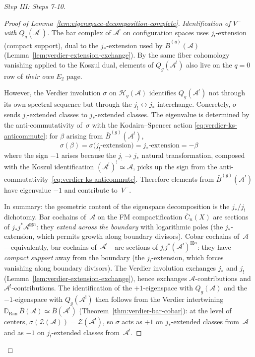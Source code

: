 \begin{proof}[Step III: Steps 7-10]
\begin{proof}[Proof of Lemma~\ref{lem:eigenspace-decomposition-complete}]
\emph{Identification of $V^-$ with $Q_g(\mathcal{A}^!)$.}
The bar complex of $\mathcal{A}^!$ on configuration spaces uses
$j_!$-extension (compact support), dual to the $j_*$-extension used
by $\bar{B}^{(g)}(\mathcal{A})$
(Lemma~\ref{lem:verdier-extension-exchange}).
By the same fiber cohomology vanishing applied to the Koszul dual,
elements of $Q_g(\mathcal{A}^!)$ also live on the $q = 0$ row of
\emph{their own} $E_2$ page.

However, the Verdier involution $\sigma$ on
$\mathcal{H}_g(\mathcal{A})$ identifies $Q_g(\mathcal{A}^!)$ not
through its own spectral sequence but through the $j_! \leftrightarrow j_*$
interchange.  Concretely, $\sigma$ sends
$j_!$-extended classes to $j_*$-extended classes.
The eigenvalue is determined by the anti-commutativity
of~$\sigma$ with the Kodaira--Spencer action
\eqref{eq:verdier-ks-anticommute}: for $\beta$ arising from
$\bar{B}^{(g)}(\mathcal{A}^!)$,
\[
\sigma(\beta)
= \sigma\bigl(\text{$j_!$-extension}\bigr)
= \text{$j_*$-extension}
= -\beta
\]
where the sign $-1$ arises because the $j_! \to j_*$ natural
transformation, composed with the Koszul identification
$(\mathcal{A}^!)^! \simeq \mathcal{A}$, picks up the sign from
the anti-commutativity~\eqref{eq:verdier-ks-anticommute}.
Therefore elements from $\bar{B}^{(g)}(\mathcal{A}^!)$ have
eigenvalue $-1$ and contribute to~$V^-$.

In summary: the geometric content of the eigenspace decomposition
is the $j_*/j_!$ dichotomy.
Bar cochains of~$\mathcal{A}$ on the FM compactification
$\overline{C}_n(X)$ are sections of
$j_*j^*\mathcal{A}^{\boxtimes n}$: they \emph{extend across the
boundary} with logarithmic poles (the $j_*$-extension, which
permits growth along boundary divisors).
Cobar cochains of~$\mathcal{A}$---equivalently, bar cochains
of~$\mathcal{A}^!$---are sections of
$j_!j^*(\mathcal{A}^!)^{\boxtimes n}$: they have \emph{compact
support} away from the boundary (the $j_!$-extension, which
forces vanishing along boundary divisors).
The Verdier involution exchanges $j_*$ and $j_!$
(Lemma~\ref{lem:verdier-extension-exchange}), hence exchanges
$\mathcal{A}$-contributions and $\mathcal{A}^!$-contributions.
The identification of the $+1$-eigenspace with
$Q_g(\mathcal{A})$ and the $-1$-eigenspace with
$Q_g(\mathcal{A}^!)$ then follows from the Verdier intertwining
$\mathbb{D}_{\mathrm{Ran}}\, \bar{B}(\mathcal{A}) \simeq
\bar{B}(\mathcal{A}^!)$ (Theorem~\ref{thm:verdier-bar-cobar}):
at the level of centers,
$\sigma(\mathcal{Z}(\mathcal{A})) = \mathcal{Z}(\mathcal{A}^!)$,
so $\sigma$ acts as $+1$ on $j_*$-extended classes from~$\mathcal{A}$
and as $-1$ on $j_!$-extended classes from~$\mathcal{A}^!$.


\end{proof}
\end{proof}
